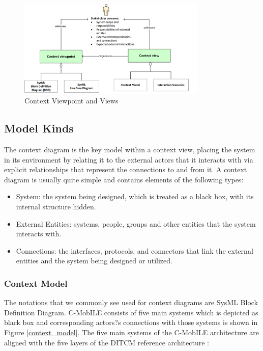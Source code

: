 \documentclass[letterpaper, 10 pt, conference]{ieeeconf}  %
\begin{document}
\begin{figure}[t!]
	\centering
	\includegraphics[width=0.80\textwidth]{contextVP_view}
	\caption{Context Viewpoint and Views}
	\label{contextVP_view}
	\centering
\end{figure}

\subsection{Model Kinds}

The context diagram is the key model within a context view, placing the system in its environment by relating it to the external actors that it interacts with via explicit relationships that represent the connections to and from it. A context diagram is usually quite simple and contains elements of the following types:
\begin{itemize}
	\item System: the system being designed, which is treated as a black box, with its internal structure hidden.
	\item External Entities: systems, people, groups and other entities that the system interacts with.
	\item Connections: the interfaces, protocols, and connectors that link the external entities and the system being designed or utilized.
\end{itemize}

\subsubsection{Context Model}

The notations that we commonly see used for context diagrams are SysML Block Definition Diagram. C-MobILE consists of five main systems which is depicted as black box and corresponding actors?s connections with those systems is shown in Figure \ref{context_model}. The five main systems of the C-MobILE architecture are aligned with the five layers of the DITCM reference architecture \cite{dtcim}:
\end{document}
